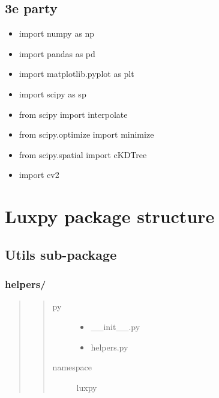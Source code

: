 \documentclass[letterpaper,10pt,english]{sphinxmanual}
\begin{document}
\section{3e party}
\label{\detokenize{required_packages:e-party}}\begin{itemize}
\item {} 
import numpy as np

\item {} 
import pandas as pd

\item {} 
import matplotlib.pyplot as plt

\item {} 
import scipy as sp

\item {} 
from scipy import interpolate

\item {} 
from scipy.optimize import minimize

\item {} 
from scipy.spatial import cKDTree

\item {} 
import cv2

\end{itemize}


\chapter{Luxpy package structure}
\label{\detokenize{luxpy_structure:luxpy-package-structure}}\label{\detokenize{luxpy_structure::doc}}

\section{Utils sub-package}
\label{\detokenize{utils:utils-sub-package}}\label{\detokenize{utils::doc}}

\subsection{helpers/}
\label{\detokenize{utils:helpers}}\begin{quote}
\begin{quote}\begin{description}
\item[{py}] \leavevmode\begin{itemize}
\item {} 
\_\_init\_\_.py

\item {} 
helpers.py

\end{itemize}

\item[{namespace}] \leavevmode
luxpy

\end{description}\end{quote}
\end{quote}
\label{\detokenize{utils:module-luxpy.utils.helpers}}
\end{document}
